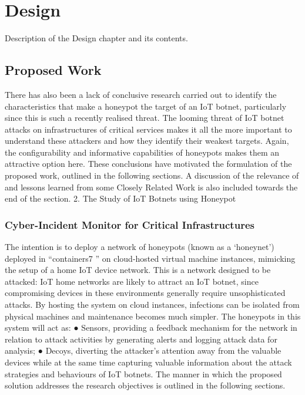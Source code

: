 \chapter{Design}

Description of the Design chapter and its contents.


\section{Proposed Work}

There has also been a lack of conclusive research carried out to identify the characteristics that make a honeypot the target of an IoT botnet, particularly since this is such a recently realised threat. The looming threat of IoT botnet attacks on infrastructures of critical services makes it all the more important to understand these attackers and how they identify their weakest targets. Again, the configurability and informative capabilities of honeypots makes them an attractive option here. These conclusions have motivated the formulation of the proposed work, outlined in the following sections. A discussion of the relevance of and lessons learned from some Closely Related Work is also included towards the end of the section.
2. The Study of IoT Botnets using Honeypot

\subsection{Cyber-Incident Monitor for Critical Infrastructures}

The intention is to deploy a network of honeypots (known as a ‘honeynet’) deployed in “containers7
”
on cloud-hosted virtual machine instances, mimicking the setup of a home IoT device network. This
is a network designed to be attacked: IoT home networks are likely to attract an IoT botnet, since
compromising devices in these environments generally require unsophisticated attacks. By hosting
the system on cloud instances, infections can be isolated from physical machines and maintenance
becomes much simpler.
The honeypots in this system will act as:
● Sensors, providing a feedback mechanism for the network in relation to attack activities by
generating alerts and logging attack data for analysis;
● Decoys, diverting the attacker’s attention away from the valuable devices while at the same
time capturing valuable information about the attack strategies and behaviours of IoT
botnets.
The manner in which the proposed solution addresses the research objectives is outlined in the
following sections.

